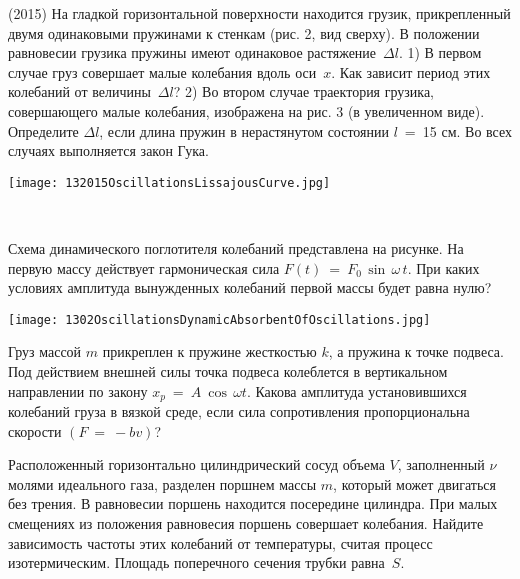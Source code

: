 \begin{ex}
(2015) На гладкой горизонтальной поверхности находится грузик, прикрепленный двумя одинаковыми пружинами к стенкам (рис. 2, вид сверху). 
В положении равновесии грузика пружины имеют одинаковое растяжение~$\Delta l$. 1) В первом случае груз совершает малые колебания вдоль оси~$x$. 
Как зависит период этих колебаний от величины~$\Delta l$?   2) Во втором случае траектория грузика, совершающего малые колебания, изображена на рис. 3 (в увеличенном виде).
Определите $\Delta l$, если длина пружин в нерастянутом состоянии $l$~=~15 см. Во всех случаях выполняется закон Гука.
\begin{center}
\texttt{[image: 132015OscillationsLissajousCurve.jpg]}
\end{center}
\begin{ans}
\end{ans}
\end{ex}

\begin{ex}
\hspace{0pt} \\
\begin{minipage}{.65\textwidth}
Схема динамического поглотителя колебаний представлена на рисунке. На первую массу действует гармоническая сила $F(t)~=~F_0\,\sin\,\omega\,t$. 
При каких условиях амплитуда вынужденных колебаний первой массы будет равна нулю?
\end{minipage}
\begin{minipage}{.35\textwidth}
\centering
\texttt{[image: 1302OscillationsDynamicAbsorbentOfOscillations.jpg]}
\end{minipage}
\begin{ans}
\end{ans}
\end{ex}

\begin{ex}
Груз массой $m$ прикреплен к пружине жесткостью $k$, а пружина к точке подвеса. 
Под действием внешней силы точка подвеса колеблется в вертикальном направлении по закону $x_p~=~A~\cos\,\omega t$. 
Какова амплитуда установившихся колебаний груза в вязкой среде, если сила сопротивления пропорциональна скорости $(F~=~-bv)$?
\begin{ans}
\end{ans}
\end{ex}

\begin{ex} Расположенный горизонтально цилиндрический сосуд объема $V$, заполненный $\nu$ молями идеального газа, 
разделен поршнем массы $m$, который может двигаться без трения. В равновесии поршень находится посередине цилиндра. 
При малых смещениях из положения равновесия поршень совершает колебания. Найдите зависимость частоты этих колебаний от температуры, 
считая процесс изотермическим. Площадь поперечного сечения трубки равна~$S$.
\begin{ans}
\end{ans}
\end{ex}

